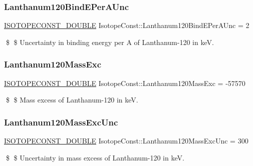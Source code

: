 \subsubsection{\texorpdfstring{Lanthanum120\+Bind\+E\+Per\+A\+Unc}{Lanthanum120BindEPerAUnc}}
{\footnotesize\ttfamily \mbox{\hyperlink{group___isotope_const-_macros_ga8f45a7272ce02c0b4c65c44636ed719a}{I\+S\+O\+T\+O\+P\+E\+C\+O\+N\+S\+T\+\_\+\+D\+O\+U\+B\+LE}} Isotope\+Const\+::\+Lanthanum120\+Bind\+E\+Per\+A\+Unc = 2}

\$ \$ Uncertainty in binding energy per A of Lanthanum-\/120 in keV. \mbox{\label{group___isotope_const-_lanthanum-_la120_gacd3351f9dabb895448e331afd789b6e5}} 
\subsubsection{\texorpdfstring{Lanthanum120\+Mass\+Exc}{Lanthanum120MassExc}}
{\footnotesize\ttfamily \mbox{\hyperlink{group___isotope_const-_macros_ga8f45a7272ce02c0b4c65c44636ed719a}{I\+S\+O\+T\+O\+P\+E\+C\+O\+N\+S\+T\+\_\+\+D\+O\+U\+B\+LE}} Isotope\+Const\+::\+Lanthanum120\+Mass\+Exc = -\/57570}

\$ \$ Mass excess of Lanthanum-\/120 in keV. \mbox{\label{group___isotope_const-_lanthanum-_la120_ga7b9a8678deead54430c5e8ed316ca982}} 
\subsubsection{\texorpdfstring{Lanthanum120\+Mass\+Exc\+Unc}{Lanthanum120MassExcUnc}}
{\footnotesize\ttfamily \mbox{\hyperlink{group___isotope_const-_macros_ga8f45a7272ce02c0b4c65c44636ed719a}{I\+S\+O\+T\+O\+P\+E\+C\+O\+N\+S\+T\+\_\+\+D\+O\+U\+B\+LE}} Isotope\+Const\+::\+Lanthanum120\+Mass\+Exc\+Unc = 300}

\$ \$ Uncertainty in mass excess of Lanthanum-\/120 in keV. \mbox{\label{group___isotope_const-_lanthanum-_la120_ga216724e044c7a109c4d73ad669821ddd}} 
